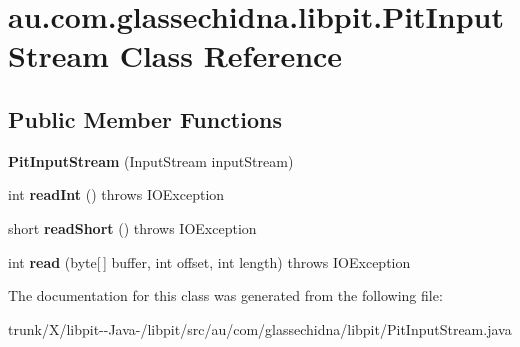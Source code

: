 \hypertarget{classau_1_1com_1_1glassechidna_1_1libpit_1_1PitInputStream}{\section{au.\-com.\-glassechidna.\-libpit.\-Pit\-Input\-Stream Class Reference}
\label{classau_1_1com_1_1glassechidna_1_1libpit_1_1PitInputStream}
}
\subsection*{Public Member Functions}
\begin{DoxyCompactItemize}
\item 
\hypertarget{classau_1_1com_1_1glassechidna_1_1libpit_1_1PitInputStream_a7847cd08da49b7a45dd12358787b3a84}{{\bfseries Pit\-Input\-Stream} (Input\-Stream input\-Stream)}\label{classau_1_1com_1_1glassechidna_1_1libpit_1_1PitInputStream_a7847cd08da49b7a45dd12358787b3a84}

\item 
\hypertarget{classau_1_1com_1_1glassechidna_1_1libpit_1_1PitInputStream_ac38c807937512293cfc715854e089f1e}{int {\bfseries read\-Int} ()  throws I\-O\-Exception 	}\label{classau_1_1com_1_1glassechidna_1_1libpit_1_1PitInputStream_ac38c807937512293cfc715854e089f1e}

\item 
\hypertarget{classau_1_1com_1_1glassechidna_1_1libpit_1_1PitInputStream_a2d64daac0f1788344becf9b5f86607a9}{short {\bfseries read\-Short} ()  throws I\-O\-Exception 	}\label{classau_1_1com_1_1glassechidna_1_1libpit_1_1PitInputStream_a2d64daac0f1788344becf9b5f86607a9}

\item 
\hypertarget{classau_1_1com_1_1glassechidna_1_1libpit_1_1PitInputStream_a04287c2a419eae6997d51330d07fd795}{int {\bfseries read} (byte\mbox{[}$\,$\mbox{]} buffer, int offset, int length)  throws I\-O\-Exception 	}\label{classau_1_1com_1_1glassechidna_1_1libpit_1_1PitInputStream_a04287c2a419eae6997d51330d07fd795}

\end{DoxyCompactItemize}


The documentation for this class was generated from the following file\-:\begin{DoxyCompactItemize}
\item 
trunk/\-X/libpit-\/-\/\-Java-\//libpit/src/au/com/glassechidna/libpit/Pit\-Input\-Stream.\-java\end{DoxyCompactItemize}
